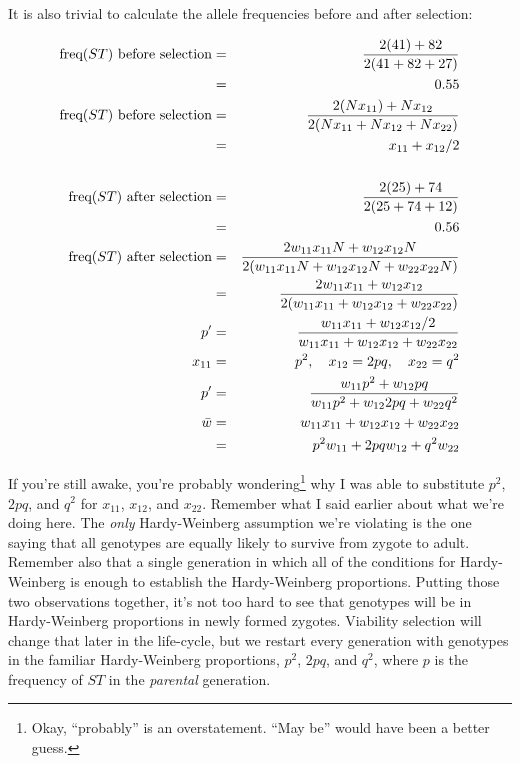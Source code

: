 It is also trivial to calculate the allele frequencies before and
after selection:

\begin{eqnarray*}
\hbox{freq($ST$) before selection}
 &=& \frac{2(41) + 82}{2(41 + 82 + 27)} \\
 &=& 0.55 \\
\hbox{freq($ST$) before selection}
 &=& \frac{2(Nx_{11}) + Nx_{12}}{2(Nx_{11} + Nx_{12} + Nx_{22})} \\
 &=& x_{11} + x_{12}/2 \\
&& \\
\hbox{freq($ST$) after selection}
 &=& \frac{2(25) + 74}{2(25 + 74 + 12)} \\
 &=& 0.56 \\
\hbox{freq($ST$) after selection}
 &=& \frac{2w_{11}x_{11}N + w_{12}x_{12}N}{2(w_{11}x_{11}N + w_{12}x_{12}N + w_{22}x_{22}N)} \\
 &=& \frac{2w_{11}x_{11} + w_{12}x_{12}}{2(w_{11}x_{11} + w_{12}x_{12} + w_{22}x_{22})} \\
p' &=& \frac{w_{11}x_{11} + w_{12}x_{12}/2}{w_{11}x_{11} +
 w_{12}x_{12} + w_{22}x_{22}} \\
x_{11} &=& p^2, \quad x_{12} = 2pq, \quad x_{22} = q^2 \\
p' &=& \frac{w_{11}p^2 + w_{12}pq}{w_{11}p^2 + w_{12}2pq + w_{22}q^2} \\
\bar w &=& w_{11}x_{11} + w_{12}x_{12} + w_{22}x_{22} \\
       &=& p^2w_{11} + 2pqw_{12} + q^2w_{22}
\end{eqnarray*}

If you're still awake, you're probably wondering\footnote{Okay,
  ``probably'' is an overstatement. ``May be'' would have been a
  better guess.} why I was able to substitute $p^2$, $2pq$, and $q^2$
for $x_{11}$, $x_{12}$, and $x_{22}$. Remember what I said earlier
about what we're doing here. The {\it only\/} Hardy-Weinberg
assumption we're violating is the one saying that all genotypes are
equally likely to survive from zygote to adult. Remember also that a
single generation in which all of the conditions for Hardy-Weinberg is
enough to establish the Hardy-Weinberg proportions. Putting those two
observations together, it's not too hard to see that genotypes will be
in Hardy-Weinberg proportions in newly formed zygotes. Viability
selection will change that later in the life-cycle, but we restart
every generation with genotypes in the familiar Hardy-Weinberg
proportions, $p^2$, $2pq$, and $q^2$, where $p$ is the frequency of
$ST$ in the {\it parental\/} generation.

